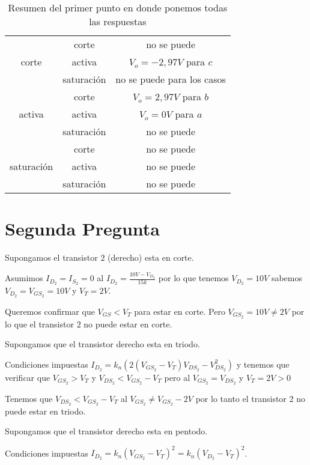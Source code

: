 \documentclass[12pt]{exam}
\begin{document}
    \begin{table}[H]
      \centering
      \caption{Resumen del primer punto en donde ponemos todas las respuestas}
      \label{tab:respuestas_1}
      \begin{tabular}{|c|c|c|}
	\hline
	&corte&no se puede\\
	corte&activa&$V_o = -2,97V$ para $c$ \\
	     & saturación & no se puede para los casos\\
	 \hline 
	     &corte&$V_o = 2,97V$ para $b$ \\
	activa&activa& $V_o = 0V$ para $a$\\
	      &saturación&no se puede\\
	      \hline
	      &corte&no se puede\\
	saturación&activa&no se puede\\
		  &saturación&no se puede\\
		  \hline
      \end{tabular}
    \end{table}

    \section*{Segunda Pregunta}

    Supongamos el transistor $2$ (derecho) esta en corte.

    Asumimos $I_{D_2} = I_{S_2} = 0$ al $I_{D_2} = \frac{10V - V_{D_2}}{15k}$ por lo que tenemos $V_{D_2} = 10V$ sabemos $V_{D_2}=V_{GS_2}=10V$ y $V_T = 2V$.

    Queremos confirmar que $V_{GS} < V_T$ para estar en corte. Pero $V_{GS_2} = 10V \neq 2V$ por lo que el transistor $2$ no puede estar en corte.

    Supongamos que el transistor derecho esta en triodo.

    Condiciones impuestas $I_{D_2} = k_n \left( 2\left( V_{GS_2} - V_T \right) V_{DS_2} - V_{DS_2}^2 \right) $ y tenemos que verificar que $V_{GS_2} > V_T$ y $V_{DS_2} < V_{GS_2} - V_T$ pero al $V_{GS_2} = V_{DS_2}$ y $V_T = 2V > 0$

    Tenemos que $V_{DS_2} < V_{GS_2} - V_T$ al $V_{GS_2} \neq V_{GS_2} - 2V$ por lo tanto el transistor 2 no puede estar en triodo.

    Supongamos que el transistor derecho esta en pentodo.

    Condiciones impuestas $I_{D_2} = k_n\left( V_{GS_2}-V_T \right)^2 = k_n\left( V_{D_2} - V_T \right)^2$. 
\end{document}
